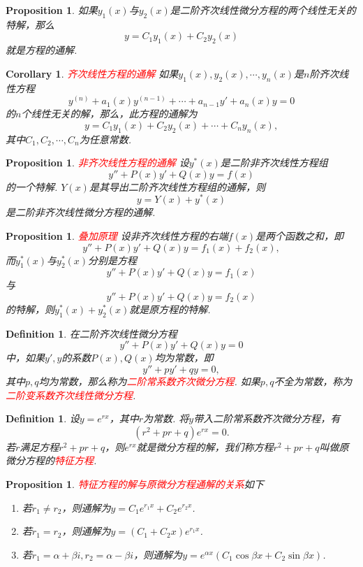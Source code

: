 \documentclass{article}
\newtheorem{corollary}[theorem]{Corollary}
\newtheorem{proposition}[theorem]{Proposition}
\newtheorem{definition}[theorem]{Definition}
\newcommand{\redt}[1]{\textcolor{red}{#1}}
\begin{document}
\begin{proposition}
\rm 如果$y_1(x)$与$y_2(x)$是二阶齐次线性微分方程的两个线性无关的特解，那么
$$
y = C_1y_1(x) + C_2y_2(x)
$$
就是方程的通解. 
\end{proposition}

\begin{corollary}
\rm \redt{齐次线性方程的通解} 如果$y_1(x),y_2(x),\cdots,y_n(x)$是$n$阶齐次线性方程
$$
y^{(n)} + a_1(x)y^{(n-1)} + \cdots + a_{n-1}y' + a_n(x)y = 0
$$
的$n$个线性无关的解，那么，此方程的通解为
$$
y = C_1y_1(x) + C_2y_2(x) + \cdots + C_ny_n(x),
$$
其中$C_1,C_2,\cdots,C_n$为任意常数. 
\end{corollary}

\begin{proposition}
\rm \redt{非齐次线性方程的通解} 设$y^*(x)$是二阶非齐次线性方程组
$$
y'' + P(x)y' + Q(x)y = f(x)
$$
的一个特解. $Y(x)$是其导出二阶齐次线性方程组的通解，则
$$
y = Y(x) + y^*(x)
$$
是二阶非齐次线性微分方程的通解. 
\end{proposition}


\begin{proposition}
\rm \redt{叠加原理} 设非齐次线性方程的右端$f(x)$是两个函数之和，即
$$
y'' + P(x)y' + Q(x)y = f_1(x) + f_2(x),
$$
而$y^*_1(x)$与$y^*_2(x)$分别是方程
$$
y'' + P(x)y' + Q(x)y = f_1(x)
$$
与
$$
y'' + P(x)y' + Q(x)y = f_2(x) 
$$
的特解，则$y^*_1(x)+y^*_2(x)$就是原方程的特解. 
\end{proposition}

\begin{definition}
\rm 在二阶齐次线性微分方程
$$
y'' + P(x)y' + Q(x)y = 0
$$
中，如果$y',y$的系数$P(x),Q(x)$均为常数，即
$$
y'' + py' + qy =0,
$$
其中$p,q$均为常数，那么称为\redt{二阶常系数齐次微分方程}. 如果$p,q$不全为常数，称为\redt{二阶变系数齐次线性微分方程}.   
\end{definition}

\begin{definition}
\rm 设$y=e^{rx}$，其中$r$为常数. 将$y$带入二阶常系数齐次微分方程，有
$$
(r^2+pr+q)e^{rx} = 0.
$$
若$r$满足方程$r^2+pr+q$，则$e^{rx}$就是微分方程的解，我们称方程$r^2+pr+q$叫做原微分方程的\redt{特征方程}.
\end{definition}

\begin{proposition}
\rm \redt{特征方程的解与原微分方程通解的关系}如下
\begin{enumerate}
	\item 若$r_1 \neq r_2$，则通解为$y = C_1e^{r_1x}+C_2e^{r_2x}$.
	\item 若$r_1 = r_2$，则通解为$y = (C_1 + C_2x)e^{r_1x}$.
	\item 若$r_1 = \alpha + \beta i , r_2 = \alpha - \beta i$，则通解为$y = e^{\alpha x}(C_1\cos\beta x + C_2\sin\beta x)$.
\end{enumerate}
\end{proposition}
\end{document}
